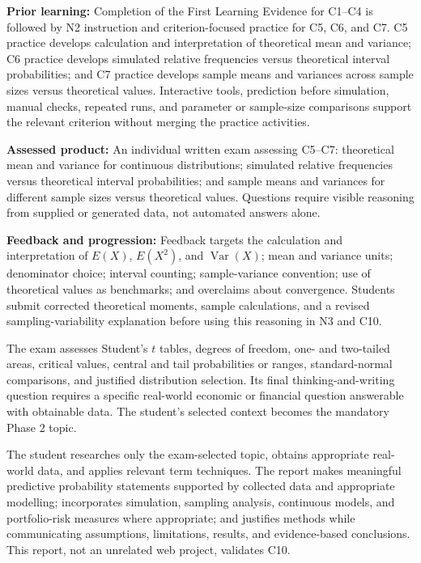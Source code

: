 \documentclass[10pt,letterpaper]{article}
\newcommand{\labelled}[2]{\textbf{#1:} #2\par}
\newcommand{\plansubsection}[1]{\Needspace{7\baselineskip}\par\vspace{5pt}{\normalsize\bfseries #1\par}\vspace{1pt}}
\newcommand{\criterionpart}[1]{\Needspace{10\baselineskip}\par\vspace{4pt}{\bfseries #1\par}}
\begin{document}
	\plansubsection{Second Learning Evidence --- Individual C5--C7 written exam}
	\labelled{Prior learning}{Completion of the First Learning Evidence for C1--C4 is followed by N2 instruction and criterion-focused practice for C5, C6, and C7. C5 practice develops calculation and interpretation of theoretical mean and variance; C6 practice develops simulated relative frequencies versus theoretical interval probabilities; and C7 practice develops sample means and variances across sample sizes versus theoretical values. Interactive tools, prediction before simulation, manual checks, repeated runs, and parameter or sample-size comparisons support the relevant criterion without merging the practice activities.}
	\labelled{Assessed product}{An individual written exam assessing C5--C7: theoretical mean and variance for continuous distributions; simulated relative frequencies versus theoretical interval probabilities; and sample means and variances for different sample sizes versus theoretical values. Questions require visible reasoning from supplied or generated data, not automated answers alone.}
	\labelled{Feedback and progression}{Feedback targets the calculation and interpretation of $E(X)$, $E(X^2)$, and $\operatorname{Var}(X)$; mean and variance units; denominator choice; interval counting; sample-variance convention; use of theoretical values as benchmarks; and overclaims about convergence. Students submit corrected theoretical moments, sample calculations, and a revised sampling-variability explanation before using this reasoning in N3 and C10.}
	
	\plansubsection{Third Learning Evidence --- Two phases for C8--C10}
	\criterionpart{Phase 1 -- Individual C8--C9 exam}
	The exam assesses Student's $t$ tables, degrees of freedom, one- and two-tailed areas, critical values, central and tail probabilities or ranges, standard-normal comparisons, and justified distribution selection. Its final thinking-and-writing question requires a specific real-world economic or financial question answerable with obtainable data. The student's selected context becomes the mandatory Phase 2 topic.
	
	\criterionpart{Phase 2 -- Individual C10 report}
	The student researches only the exam-selected topic, obtains appropriate real-world data, and applies relevant term techniques. The report makes meaningful predictive probability statements supported by collected data and appropriate modelling; incorporates simulation, sampling analysis, continuous models, and portfolio-risk measures where appropriate; and justifies methods while communicating assumptions, limitations, results, and evidence-based conclusions. This report, not an unrelated web project, validates C10.
	
\end{document}
